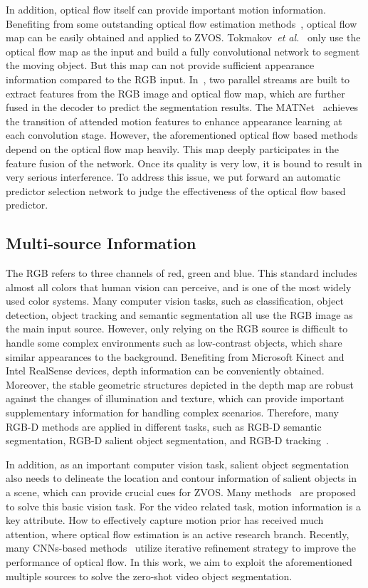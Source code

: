 \documentclass[sigconf]{acmart}
\begin{document}
In addition, optical flow itself can provide important motion information. Benefiting from some outstanding optical flow estimation methods~\cite{RAFT,MaskFlowNet,PWC}, optical flow map can be easily obtained and applied to ZVOS.
Tokmakov~\textit{et al.}~\cite{MP} only use the optical flow map as the input and build a fully convolutional network to segment the moving object. But this map can not provide sufficient appearance information compared to the RGB input. In~\cite{LVO,SFL,UVOS-Bilateral,MATNet}, two parallel streams are built to extract features from the RGB image and optical flow map, which are further fused in the decoder to predict the segmentation results. The MATNet~\cite{MATNet} achieves the transition of attended motion features to enhance appearance learning at each convolution stage. However, the aforementioned optical flow based methods depend on the optical flow map heavily. 
This map deeply participates in the feature fusion of the network. 
Once its quality is very low, it is bound to result in very serious interference. To address this issue, we put forward an automatic predictor selection network to judge the effectiveness of the optical flow based predictor.


\subsection{Multi-source Information}
The RGB refers to three channels of red, green and blue. This standard includes almost all colors that human vision can perceive, and is one of the most widely used color systems. Many computer vision tasks, such as classification, object detection, object tracking and semantic segmentation all use the RGB image as the main input source. However, only relying on the RGB source is difficult to handle some complex environments such as low-contrast objects, which share similar appearances to the background. 
Benefiting from  Microsoft  Kinect and  Intel  RealSense devices, depth information can be conveniently obtained. Moreover, the stable geometric structures depicted in the depth map are  robust  against the changes of illumination and texture, which can provide important supplementary information for handling complex scenarios. 
Therefore, many RGB-D methods are applied in different tasks, such as RGB-D semantic segmentation,  RGB-D salient object segmentation, and RGB-D tracking~\cite{rgbd-tracking1,rgbd-tracking2,rgbd-tracking3}. 

In addition, as an important computer vision task, salient object segmentation also needs to delineate the location and contour information of salient objects in a scene, which can provide crucial cues for ZVOS.
Many methods~\cite{GateNet,BASNet,DSS} are proposed to solve this basic vision task. 
For the video related task, motion information is a key attribute. How to effectively capture motion prior has received much attention, where optical flow estimation is an active research branch. 
Recently, many CNNs-based methods~\cite{SFN,PWC,liteflownet,VCN} utilize iterative refinement strategy to improve the performance of optical flow.
In this work, we aim to exploit the aforementioned multiple sources to solve the zero-shot video object segmentation.
\end{document}
